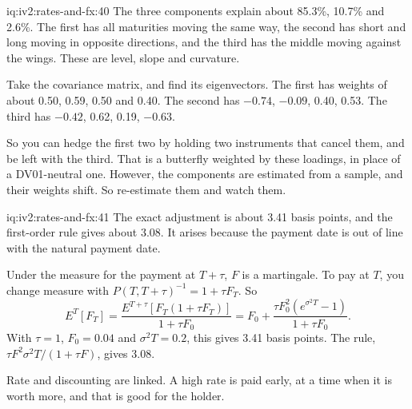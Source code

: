 \begin{solution}{iq:iv2:rates-and-fx:40}
The three components explain about 85.3\%, 10.7\% and 2.6\%. The first has all maturities moving the same way, the second has short and long moving in opposite directions, and the third has the middle moving against the wings. These are level, slope and curvature.

Take the covariance matrix, and find its eigenvectors. The first has weights of about 0.50, 0.59, 0.50 and 0.40. The second has $-0.74$, $-0.09$, 0.40, 0.53. The third has $-0.42$, 0.62, 0.19, $-0.63$.

So you can hedge the first two by holding two instruments that cancel them, and be left with the third. That is a butterfly weighted by these loadings, in place of a DV01-neutral one. However, the components are estimated from a sample, and their weights shift. So re-estimate them and watch them.

\end{solution}

\begin{solution}{iq:iv2:rates-and-fx:41}
The exact adjustment is about 3.41 basis points, and the first-order rule gives about 3.08. It arises because the payment date is out of line with the natural payment date.

Under the measure for the payment at $T + \tau$, $F$ is a martingale. To pay at $T$, you change measure with $P(T, T + \tau)^{-1} = 1 + \tau F_T$. So
\[
E^T[F_T] = \frac{E^{T+\tau}[F_T(1 + \tau F_T)]}{1 + \tau F_0} = F_0 + \frac{\tau F_0^2(e^{\sigma^2T} - 1)}{1 + \tau F_0}.
\]
With $\tau = 1$, $F_0 = 0.04$ and $\sigma^2T = 0.2$, this gives 3.41 basis points. The rule, $\tau F^2\sigma^2T/(1 + \tau F)$, gives 3.08.

Rate and discounting are linked. A high rate is paid early, at a time when it is worth more, and that is good for the holder.

\end{solution}

